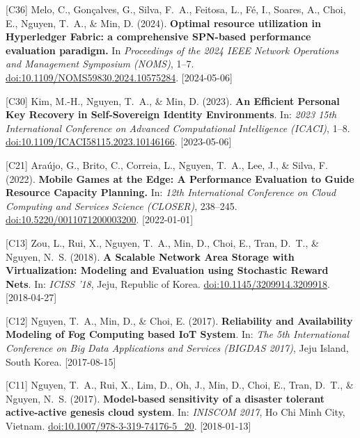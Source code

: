 {\begin{pubenumerate}
\item {\color{green}[C36]} Melo, C., Gon\c{c}alves, G., Silva, F.\ A., Feitosa, L., F\'e, I., Soares, A., Choi, E., Nguyen, T.\ A., \& Min, D. (2024). 
  \textbf{Optimal resource utilization in Hyperledger Fabric: a comprehensive SPN-based performance evaluation paradigm.} 
  In \textit{Proceedings of the 2024 IEEE Network Operations and Management Symposium (NOMS)}, 1--7. 
  \href{https://doi.org/10.1109/NOMS59830.2024.10575284}{doi:10.1109/NOMS59830.2024.10575284}. [2024-05-06]

\item {\color{green}[C30]} Kim, M.-H., Nguyen, T.\ A., \& Min, D. (2023). \textbf{An Efficient Personal Key Recovery in Self-Sovereign Identity Environments}. In: \textit{2023 15th International Conference on Advanced Computational Intelligence (ICACI)}, 1--8. \href{https://doi.org/10.1109/ICACI58115.2023.10146166}{doi:10.1109/ICACI58115.2023.10146166}. [2023-05-06]

\item {\color{green}[C21]} Ara\'ujo, G., Brito, C., Correia, L., Nguyen, T.\ A., Lee, J., \& Silva, F. (2022). \textbf{Mobile Games at the Edge: A Performance Evaluation to Guide Resource Capacity Planning.} In: \textit{12th International Conference on Cloud Computing and Services Science (CLOSER)}, 238--245. \href{https://doi.org/10.5220/0011071200003200}{doi:10.5220/0011071200003200}. [2022-01-01]

\item {\color{green}[C13]} Zou, L., Rui, X., Nguyen, T.\ A., Min, D., Choi, E., Tran, D.\ T., \& Nguyen, N.\ S. (2018). \textbf{A Scalable Network Area Storage with Virtualization: Modeling and Evaluation using Stochastic Reward Nets}. In: \textit{ICISS '18}, Jeju, Republic of Korea. \href{https://doi.org/10.1145/3209914.3209918}{doi:10.1145/3209914.3209918}. [2018-04-27]

\item {\color{green}[C12]} Nguyen, T.\ A., Min, D., \& Choi, E. (2017). \textbf{Reliability and Availability Modeling of Fog Computing based IoT System}. In: \textit{The 5th International Conference on Big Data Applications and Services (BIGDAS 2017)}, Jeju Island, South Korea. [2017-08-15]

\item {\color{green}[C11]} Nguyen, T.\ A., Rui, X., Lim, D., Oh, J., Min, D., Choi, E., Tran, D.\ T., \& Nguyen, N.\ S. (2017). \textbf{Model-based sensitivity of a disaster tolerant active-active genesis cloud system}. In: \textit{INISCOM 2017}, Ho Chi Minh City, Vietnam. \href{https://doi.org/10.1007/978-3-319-74176-5_20}{doi:10.1007/978-3-319-74176-5\_20}. [2018-01-13]


\end{pubenumerate}}
